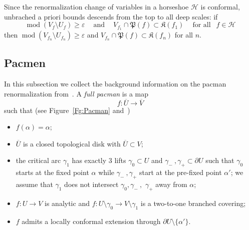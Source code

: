 \documentclass{amsart}
\renewcommand{\sp}{{\ \ }}
\newcommand{\1}{{\mathbb 1 }}
\newcommand\Hors{{\mathcal H}}
\newcommand\Kfilled{{\mathfrak K}}
\newcommand\Post{{\mathfrak P}}
\theoremstyle{remark}
\numberwithin{equation}{section}
\theoremstyle{definition}
\renewcommand{\mod}{\operatorname{mod}}
\theoremstyle{nonumberbreak}
\begin{document}
 
 Since the renormalization change of variables in a horseshoe $\Hors$ is conformal, unbrached a priori bounds descends from the top to all deep scales: if
 \[  \mod (V_f\setminus U_f)\ge \varepsilon\sp\sp\text{ and }\sp\sp V_{f_1} \cap \Post(f) \subset  \Kfilled (f_1) \sp\sp \text{ for all }\sp f\in \Hors\]
 then $\mod (V_{f_n}\setminus U_{f_n})\ge \varepsilon$ and $V_{f_n} \cap \Post(f) \subset  \Kfilled (f_n)$ for all $n$.

\subsection{Pacmen} In this subsection we collect the background information on the pacman renormalization from~\cite{DLS}. A \emph{full pacman} is a map \[f:\overline{U}
\to \overline{V}\] such that (see  Figure~\ref{Fg:Pacman} and~\cite[Definition 2.1]{DLS})
\begin{itemize}
\item $f(\alpha)=\alpha$;
\item   $\overline{U}$ is a closed topological disk with $\overline{U}\subset V$;

\item the critical arc $\gamma_1$ has exactly $3$ lifts $\gamma_0\subset U$ and $\gamma_-~,\gamma_+ \subset \partial U$ such that $\gamma_0$ starts at the fixed point $\alpha$ while $\gamma_-~,\gamma_+$ start at the pre-fixed point $\alpha'$; we assume that $\gamma_1$ does not intersect $\gamma_0,\gamma_-~,$  $\gamma_+$ away from $\alpha$;
\item $f:U\to V$ is analytic and $f:U\setminus \gamma_0\to V\setminus \gamma_1$ is a two-to-one branched covering;  
\item $f$ admits a locally conformal extension through $\partial U\setminus \{\alpha'\}$.
\end{itemize}
\end{document}
